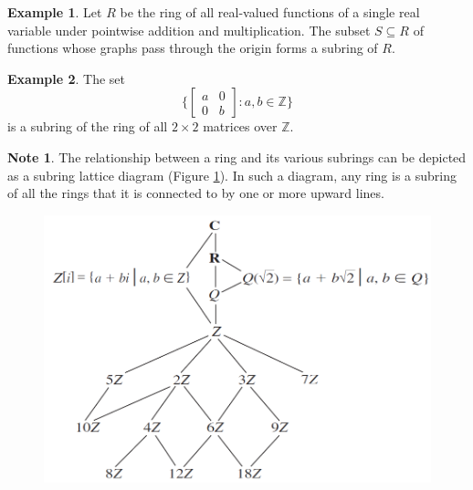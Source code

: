 \documentclass{article}
\theoremstyle{definition}
\newtheorem{example}{Example}[section]
\newtheorem{note}{Note}[section]
\begin{document}
    \begin{example}
        Let $R$ be the ring of all real-valued functions of a single real variable under pointwise addition and multiplication. The subset $S\subseteq R$ of functions whose graphs pass through the origin forms a subring of $R$.
    \end{example}
    
    \begin{example}
        The set
        \begin{equation*}
        \bigg\{
            \begin{bmatrix}
               a & 0 \\ 0 & b
            \end{bmatrix}
            : a,b\in\mathbb{Z}\bigg\}
        \end{equation*}
        is a subring of the ring of all $2\times2$ matrices over $\mathbb{Z}$.
    \end{example}
    
    \begin{note}
        The relationship between a ring and its various subrings can be depicted as a subring lattice diagram (Figure \ref{subring-lattice-diagram}). In such a diagram, any ring is a subring of all the rings that it is connected to by one or more upward lines.
    \end{note}
    
    \begin{figure}[!htbp]
        \centering
        \includegraphics[width=0.7\linewidth]{figures/subring-lattice-diagram.png}
        \caption{}
        \label{subring-lattice-diagram}
    \end{figure}
\end{document}
